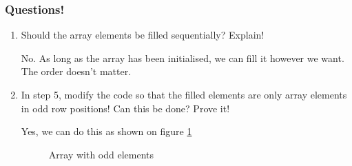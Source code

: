 \documentclass[12pt,titlepage]{article}
\begin{document}
\subsubsection*{Questions!}
\begin{enumerate}
    \item {
        Should the array elements be filled sequentially? Explain!

        No. As long as the array has been initialised, we can fill it however we want. The order doesn't matter.
    }
    \item {
        In step 5, modify the code so that the filled elements are only array elements in odd row positions! Can this be done? Prove it!

        Yes, we can do this as shown on figure \ref{arr1-proof}

        \begin{figure}[h]
            \centering
            \caption{Array with odd elements}
            \label{arr1-proof}
        \end{figure}
    }
\end{enumerate}
\end{document}
